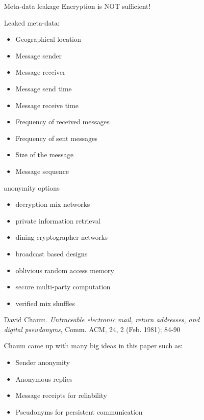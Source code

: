 \documentclass[fleqn,xcolor={usenames,dvipsnames}]{beamer} %
\begin{document}
\begin{frame}{Meta-data leakage}
  Encryption is NOT sufficient!
  \break
  
  Leaked meta-data:
  \begin{itemize}
  \item Geographical location
  \item Message sender
  \item Message receiver
  \item Message send time
  \item Message receive time
  \item Frequency of received messages
  \item Frequency of sent messages
  \item Size of the message
  \item Message sequence
  \end{itemize}
\end{frame}



\begin{frame}{anonymity options}
  \begin{itemize}
  \item decryption mix networks
  \item private information retrieval
  \item dining cryptographer networks
  \item broadcast based designs
  \item oblivious random access memory
  \item secure multi-party computation
  \item verified mix shuffles
  \end{itemize}
\end{frame}


\begin{frame}
\hspace*{3pt} David Chaum. {\em Untraceable electronic mail, return addresses, and \\
\hspace*{3pt} digital pseudonyms}, Comm. ACM, 24, 2 (Feb. 1981); 84-90
\break
\end{frame}

\begin{frame}
Chaum came up with many big ideas in this paper such as:
\begin{itemize}
  \item Sender anonymity
  \item Anonymous replies
  \item Message receipts for reliability
  \item Pseudonyms for persistent communication
  \end{itemize}
\end{frame}
\end{document}
